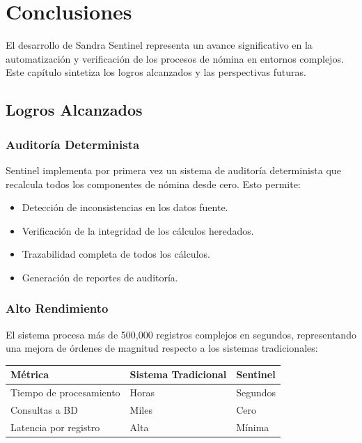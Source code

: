 \chapter{Conclusiones}

\bigskip

El desarrollo de Sandra Sentinel representa un avance significativo en la automatización y verificación de los procesos de nómina en entornos complejos. Este capítulo sintetiza los logros alcanzados y las perspectivas futuras.

\bigskip

\section{Logros Alcanzados}

\bigskip

\subsection{Auditoría Determinista}

Sentinel implementa por primera vez un sistema de auditoría determinista que recalcula todos los componentes de nómina desde cero. Esto permite:

\begin{itemize}
    \item Detección de inconsistencias en los datos fuente.
    \item Verificación de la integridad de los cálculos heredados.
    \item Trazabilidad completa de todos los cálculos.
    \item Generación de reportes de auditoría.
\end{itemize}

\bigskip

\subsection{Alto Rendimiento}

El sistema procesa más de 500,000 registros complejos en segundos, representando una mejora de órdenes de magnitud respecto a los sistemas tradicionales:

\bigskip

\begin{center}
\begin{tabular}{lll}
\toprule
\textbf{Métrica} & \textbf{Sistema Tradicional} & \textbf{Sentinel} \\
\midrule
Tiempo de procesamiento & Horas & Segundos \\
Consultas a BD & Miles & Cero \\
Latencia por registro & Alta & Mínima \\
\bottomrule
\end{tabular}
\end{center}

